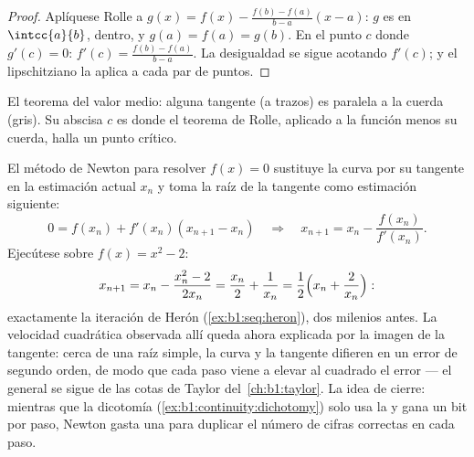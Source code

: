 \begin{proof}
Aplíquese Rolle a $g(x) = f(x) - \frac{f(b) - f(a)}{b - a}(x - a)$:
$g$ es  en $\intcc{a}{b}$,  dentro, y
$g(a) = f(a) = g(b)$. En el punto $c$ donde $g'(c) = 0$:
$f'(c) = \frac{f(b)-f(a)}{b-a}$. La desigualdad se sigue acotando
$f'(c)$; y el  lipschitziano la aplica a cada par de puntos.
\end{proof}

\begin{omfigure}

{\small El teorema del valor medio: alguna tangente (a trazos) es
paralela a la cuerda (gris). Su abscisa $c$ es donde el teorema de
Rolle, aplicado a la función menos su cuerda, halla un punto crítico.}
\end{omfigure}

\begin{example}\label{ex:b1:derivative:newton}
El método de Newton para resolver $f(x) = 0$ sustituye la curva por su
tangente en la estimación actual $x_n$ y toma la raíz de la tangente
como estimación siguiente:
\[
0 = f(x_n) + f'(x_n)(x_{n+1} - x_n)
\quad\Longrightarrow\quad
x_{n+1} = x_n - \frac{f(x_n)}{f'(x_n)} .
\]
Ejecútese sobre $f(x) = x^2 - 2$:
\[
x_{n+1} = x_n - \frac{x_n^2 - 2}{2x_n}
= \frac{x_n}{2} + \frac{1}{x_n}
= \frac12\Bigl(x_n + \frac{2}{x_n}\Bigr) :
\]
exactamente la iteración de Herón (\cref{ex:b1:seq:heron}), dos
milenios antes. La velocidad cuadrática observada allí queda ahora
explicada por la imagen de la tangente: cerca de una raíz simple, la
curva y la tangente difieren en un error de segundo orden, de modo
que cada paso viene a elevar al cuadrado el error --- el 
general se sigue de las cotas de Taylor del~\cref{ch:b1:taylor}. La
idea de cierre: mientras que la dicotomía
(\cref{ex:b1:continuity:dichotomy}) solo usa la  y gana un
bit por paso, Newton gasta una  para duplicar el número de
cifras correctas en cada paso.
\end{example}

